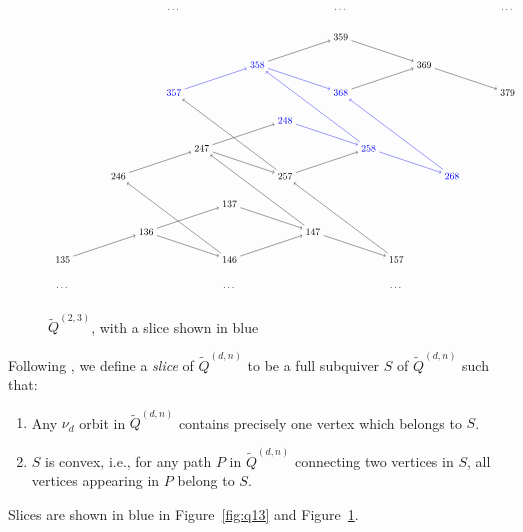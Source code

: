 \documentclass[ALCO,Unicode,published]{cedram}
\newcommand{\tqdn}{\tilde{Q}^{(d, n)}}
\begin{document}
\begin{figure}
\caption{$\tilde{Q}^{(2, 3)}$, with a slice shown in blue}\label{fig:q23}
\[
\scalebox{0.7}{
\begin{tikzpicture}


\node(zzcz) at (0,0){135};
\node(azbz) at (6,0){146};
\node(bzaz) at (12,0){157};
\node(zabz) at (3,1){136};
\node(aaaz) at (9,1){147};
\node(zbaz) at (6,2){137};

\node(zzca) at (2,3){246};
\node(azba) at (8,3){257};
\node(bzaa) at (14,3){\color{blue}{268}};
\node(zaba) at (5,4){247};
\node(aaaa) at (11,4){\color{blue}{258}};
\node(zbaa) at (8,5){\color{blue}{248}};

\node(zzcb) at (4,6){\color{blue}{357}};
\node(azbb) at (10,6){\color{blue}{368}};
\node(bzab) at (16,6){379};
\node(zabb) at (7,7){\color{blue}{358}};
\node(aaab) at (13,7){369};
\node(zbab) at (10,8){359};

\node at (0,-1){\dots};
\node at (6,-1){\dots};
\node at (12,-1){\dots};

\node at (4,9){\dots};
\node at (10,9){\dots};
\node at (16,9){\dots};


\draw[->] (zzcz) -- (zabz);
\draw[->] (zabz) -- (azbz);
\draw[->] (azbz) -- (aaaz);
\draw[->] (aaaz) -- (bzaz);
\draw[->] (zabz) -- (zbaz);
\draw[->] (zbaz) -- (aaaz);

\draw[->] (zzca) -- (zaba);
\draw[->] (zaba) -- (azba);
\draw[->] (azba) -- (aaaa);
\draw[->,blue] (aaaa) -- (bzaa);
\draw[->] (zaba) -- (zbaa);
\draw[->,blue] (zbaa) -- (aaaa);

\draw[->,blue] (zzcb) -- (zabb);
\draw[->,blue] (zabb) -- (azbb);
\draw[->] (azbb) -- (aaab);
\draw[->] (aaab) -- (bzab);
\draw[->] (zabb) -- (zbab);
\draw[->] (zbab) -- (aaab);

\draw[->] (azbz) -- (zzca);
\draw[->] (bzaz) -- (azba);
\draw[->] (aaaz) -- (zaba);

\draw[->] (azba) -- (zzcb);
\draw[->,blue] (bzaa) -- (azbb);
\draw[->,blue] (aaaa) -- (zabb);

\end{tikzpicture}
}
\]
\end{figure}

Following \cite[Definition 5.20]{io}, we define a \emph{slice} of $\tqdn$ to be a full subquiver $S$ of $\tqdn$ such that:
\begin{enumerate}
\item Any $\nu_{d}$ orbit in $\tqdn$ contains precisely one vertex which belongs to $S$.
\item $S$ is convex, i.e., for any path $P$ in $\tqdn$ connecting two vertices in $S$, all vertices appearing in $P$ belong to $S$.
\end{enumerate}
Slices are shown in blue in Figure~\ref{fig:q13} and Figure~\ref{fig:q23}.
\end{document}
